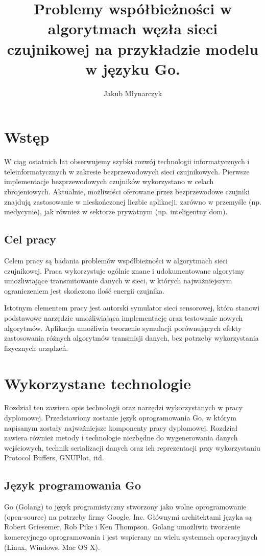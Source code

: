 \documentclass[a4paper,12pt,twoside,openany]{report}
\title{Problemy współbieżności w algorytmach węzła sieci czujnikowej na przykładzie modelu w języku Go.}
\author{Jakub Młynarczyk}
\begin{document}
\maketitle

\chapter{Wstęp}

W ciąg ostatnich lat obserwujemy szybki rozwój technologii informatycznych i teleinformatycznych w zakresie bezprzewodowych sieci czujnikowych.
Pierwsze implementacje bezprzewodowych czujników wykorzystano w celach zbrojeniowych. Aktualnie, możliwości oferowane przez bezprzewodowe 
czujniki znajdują zastosowanie w nieskończonej liczbie aplikacji, zarówno w przemyśle (np. medycynie), jak również w sektorze prywatnym (np. inteligentny dom).

\section{Cel pracy}
Celem pracy są badania problemów współbieżności w algorytmach sieci czujnikowej. Praca wykorzystuje 
ogólnie znane i udokumentowane algorytmy umożliwiające
transmitowanie danych w sieci, w których najważniejszym ograniczeniem jest skończona ilość energii czujnika.

Istotnym elementem pracy jest autorski symulator sieci sensorowej, która stanowi podstawowe narzędzie umożliwiająca implementację oraz testowanie nowych algorytmów.
Aplikacja umożliwia tworzenie symulacji porównujących efekty zastosowania różnych algorytmów transmisji danych, bez potrzeby wykorzystania fizycznych urządzeń.

\chapter{Wykorzystane technologie}

Rozdział ten zawiera opis technologii oraz narzędzi wykorzystanych w pracy dyplomowej. 
Przedstawiony zostanie język oprogramowania Go, w którym napisanym zostały najważniejsze komponenty pracy dyplomowej. Rozdział zawiera również
metody i technologie niezbędne do wygenerowania danych wejściowych, technik serializacji danych oraz ich reprezentacji przy wykorzystaniu
Protocol Buffers, GNUPlot, itd.

\section{Język programowania Go}
Go (Golang) to język programistyczny stworzony jako wolne oprogramowanie (open-source) na potrzeby firmy Google, Inc. 
Głównymi architektami języka są Robert Griesemer, Rob Pike i Ken Thompson.
Golang umożliwia tworzenie komercyjnego oprogramowania i jest wspierany na wielu systemach operacyjnych (Linux, Windows, Mac OS X).
\end{document}
